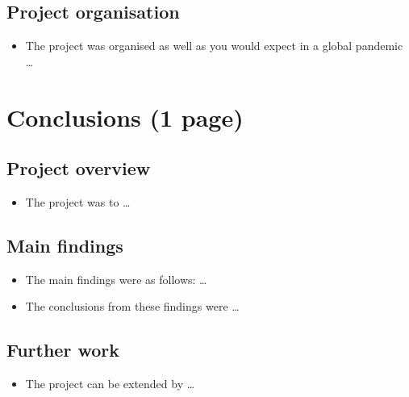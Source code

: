 \documentclass[12pt,a4paper]{article}
\begin{document}
\subsection{Project organisation}
\begin{itemize}
    \item The project was organised as well as you would expect in a global pandemic \dots
\end{itemize}

\section{Conclusions (1 page)}
\subsection{Project overview}
\begin{itemize}
    \item The project was to \dots
\end{itemize}

\subsection{Main findings}
\begin{itemize}
    \item The main findings were as follows: \dots
    \item The conclusions from these findings were \dots
\end{itemize}

\subsection{Further work}
\begin{itemize}
    \item The project can be extended by \dots
\end{itemize}

\cite{}

\end{document}
